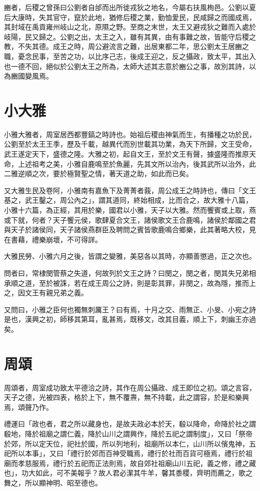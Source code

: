 豳者，后稷之曾孫曰公劉者自邰而出所徙戎狄之地名，今屬右扶風栒邑。公劉以夏后大康時，失其官守，竄於此地，猶修后稷之業，勤恤愛民，民咸歸之而國成焉，其封域在禹貢雍州岐山之北，原隰之野。至商之末世，太王又避戎狄之難而入處於岐陽，民又歸之。公劉之出，太王之入，雖有其異，由有事難之故，皆能守后稷之教，不失其德。成王之時，周公避流言之難，出居東都二年，思公劉太王居豳之職，憂念民事，至苦之功，以比序己志，後成王迎之，反之攝政，致太平，其出入也一德不回，絕似於公劉太王之所為，太師大述其志意於豳公之事，故別其詩，以為豳國變風焉。

\section*{小大雅}

小雅大雅者，周室居西都豐鎬之時詩也。始祖后稷由神氣而生，有播種之功於民，公劉至於太王王季，歷及千載，越異代而別世載其功業，為天下所歸，文王受命，武王遂定天下，盛德之隆。大雅之初，起自文王，至於文王有聲，據盛隆而推原天命，上述祖考之美，小雅自鹿鳴至於魚麗，先其文所以治內，後其武所以治外，此二雅逆順之次，要於極賢聖之情，著天道之助，如此而已矣。

又大雅生民及卷阿，小雅南有嘉魚下及菁菁者莪，周公成王之時詩也，傳曰「文王基之，武王鑿之，周公內之」，謂其道同，終始相成，比而合之，故大雅十八篇，小雅十六篇，為正經，其用於樂，國君以小雅，天子以大雅。然而饗賓或上取，燕或下就，何者？天子饗元侯，歌肆夏合文王，諸侯歌文王合鹿鳴，諸侯於鄰國之君與天子於諸侯同，天子諸侯燕群臣及聘問之賓皆歌鹿鳴合鄉樂，此其著略大校，見在書藉，禮樂崩壞，不可得詳。

大雅民勞、小雅六月之後，皆謂之變雅，美惡各以其時，亦顯善懲過，正之次也。

問者曰，常棣閔管蔡之失道，何故列於文王之詩？曰閔之，閔之者，閔其失兄弟相承順之道，至於被誅，若在成王周公之詩，則是彰其罪，非閔之，故為隱，推而上之，因文王有親兄弟之義。

又問曰，小雅之臣何也獨無刺厲王？曰有焉，十月之交、雨無正、小旻、小宛之詩是也，漢興之初，師移其第耳，亂甚焉，既移文，改其目義，順上下，刺幽王亦過矣。

\section*{周頌}

周頌者，周室成功致太平德洽之詩，其作在周公攝政、成王即位之初。頌之言容，天子之德，光被四表，格於上下，無不覆燾，無不持載，此之謂容，於是和樂興焉，頌聲乃作。

禮運曰「政也者，君之所以藏身也，是故夫政必本於天，殽以降命，命降於社之謂殽地，降於祖廟之謂仁義，降於山川之謂興作，降於五祀之謂制度」，又曰「祭帝於郊，所以定天位，祀社於國，所以列地利，祖廟所以本仁，山川所以儐鬼神，五祀所以本事」，又曰「禮行於郊而百神受職焉，禮行於社而百貨可極焉，禮行於祖廟而孝慈服焉，禮行於五祀而正法則焉，故自郊社祖廟山川五祀，義之修，禮之藏也」，功大如此，可不美報乎？故人君必潔其牛羊，馨其黍稷，齊明而薦之，歌之舞之，所以顯神明、昭至德也。

